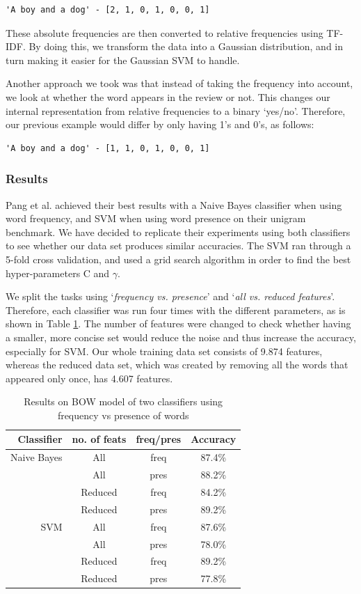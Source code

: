 \documentclass{article}
\begin{document}
\begin{lstlisting}
'A boy and a dog' - [2, 1, 0, 1, 0, 0, 1]
\end{lstlisting}

These absolute frequencies are then converted to relative frequencies using TF-IDF. By doing this, we transform the data into a Gaussian distribution, and in turn making it easier for the Gaussian SVM to handle. 

Another approach we took was that instead of taking the frequency into account, we look at whether the word appears in the review or not. This changes our internal representation from relative frequencies to a binary `yes/no'. Therefore, our previous example would differ by only having 1's and 0's, as follows:

\begin{lstlisting}
'A boy and a dog' - [1, 1, 0, 1, 0, 0, 1]
\end{lstlisting}

\subsubsection{Results}
Pang et al. \cite{pangetal} achieved their best results with a Naive Bayes classifier when using word frequency, and SVM when using word presence on their unigram benchmark. We have decided to replicate their experiments using both classifiers to see whether our data set produces similar accuracies. The SVM ran through a 5-fold cross validation, and used a grid search algorithm in order to find the best hyper-parameters C and $\gamma$. 

We split the tasks using `\textit{frequency vs. presence}' and `\textit{all vs. reduced features}'. Therefore, each classifier was run four times with the different parameters, as is shown in Table \ref{tab:bowresults}. The number of features were changed to check whether having a smaller, more concise set would reduce the noise and thus increase the accuracy, especially for SVM. Our whole training data set consists of 9.874 features, whereas the reduced data set, which was created by removing all the words that appeared only once, has 4.607 features.

\begin{table}[ht!]
  \centering
  \begin{tabular}{ r | c | c | c }
    Classifier & no. of feats & freq/pres & Accuracy \\
		\hline \hline
		Naive Bayes & All & freq & 87.4\% \\
		& All & pres & 88.2\% \\
		& Reduced & freq & 84.2\%\\
		& Reduced & pres & 89.2\%\\
		\hline
		SVM & All & freq & 87.6\%\\
		& All & pres & 78.0\% \\
		& Reduced & freq & 89.2\% \\
		& Reduced & pres & 77.8\% \\
		\hline
  \end{tabular}
  \caption{Results on BOW model of two classifiers using frequency vs presence of words}
  \label{tab:bowresults}
\end{table}
\end{document}
